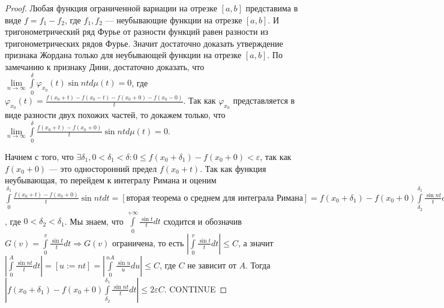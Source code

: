 \begin{proof}
	Любая функция ограниченной вариации на отрезке $[a,b]$ представима в виде $f=f_1-f_2$, где $f_1,f_2$ --- неубывающие функции на отрезке $[a,b]$. И тригонометрический ряд Фурье от разности функций равен разности из тригонометрических рядов Фурье. Значит достаточно доказать утверждение признака Жордана только для неубывающей функции на отрезке $[a,b]$. По замечанию к признаку Дини, достаточно доказать, что $\lim\limits_{n\to\infty}\int\limits_0^\delta\varphi_{x_0}(t)\sin ntd\mu(t)=0$, где $\varphi_{x_0}(t)=\frac{f(x_0+t)-f(x_0-t)-f(x_0+0)-f(x_0-0)}{t}$. Так как $\varphi_{x_0}$ представляется в виде разности двух похожих частей, то докажем только, что $\lim\limits_{n\to\infty}\int\limits_0^\delta \frac{f(x_0+t)-f(x_0+0)}{t} \sin ntd\mu(t)=0$.
	
	Начнем с того, что ${\exists\delta_1, 0<\delta_1<\delta:0\leqslant f(x_0+\delta_1)- f(x_0+0)<\varepsilon}$, так как $f(x_0+0)$ --- это односторонний предел $f(x_0+t)$. Так как функция неубывающая, то перейдем к интегралу Римана и оценим $\int\limits_0^{\delta_1}\frac{f(x_0+t)-f(x_0+0)}{t}\sin ntdt=[\text{вторая теорема о среднем для интеграла Римана}]=f(x_0+\delta_1)-f(x_0+0)\int\limits_{\delta_2}^{\delta_1}\frac{\sin nt}{t}dt$, где $0<\delta_2<\delta_1$. Мы знаем, что $\int\limits_0^{+\infty}\frac{\sin t}{t}dt$ сходится и обозначив $G(v)=\int\limits_{0}^v\frac{\sin t}{t}dt\Rightarrow G(v)$ ограничена, то есть $\left|\int\limits_0^v\frac{\sin t}{t}dt\right|\leqslant C$, а значит $\left|\int\limits_0^A\frac{\sin nt}{t}dt\right|=[u:=nt]=\left|\int\limits_0^{nA}\frac{\sin u}{u}du\right|\leqslant C$, где $C$ не зависит от $A$. Тогда $\left|f(x_0+\delta_1)-f(x_0+0)\int\limits_{\delta_2}^{\delta_1}\frac{\sin nt}{t}dt\right|\leqslant 2\varepsilon C$. CONTINUE
\end{proof}






















